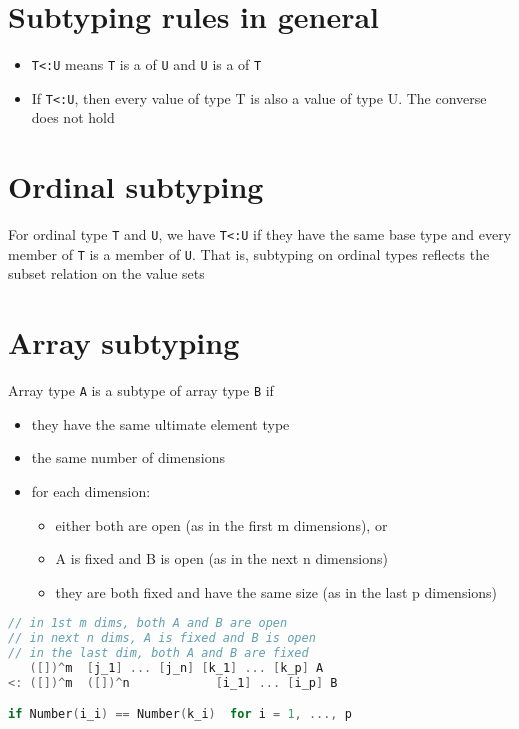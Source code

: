 \documentclass[10pt,a4paper,landscape]{article}
\begin{document}
\begin{multicols*}{3}
\section*{Subtyping rules in general}
\begin{itemize}
\item \texttt{T<:U} means \texttt{T} is a  of \texttt{U} and \texttt{U} is a  of \texttt{T}
\item If \texttt{T<:U}, then every value of type T is also a value of type U. The converse does not hold
\end{itemize}
\section*{Ordinal subtyping}
For ordinal type \texttt{T} and \texttt{U}, we have \texttt{T<:U} if they have the same base type and every member of \texttt{T} is a member of \texttt{U}. That is, subtyping on ordinal types reflects the subset relation on the value sets
\section*{Array subtyping}
Array type \texttt{A} is a subtype of array type \texttt{B} if
\begin{itemize}
\item they have the same ultimate element type
\item the same number of dimensions
\item for each dimension:
  \begin{itemize}[label=$\ast$]
  \item either both are open (as in the first m dimensions), or
  \item A is fixed and B is open (as in the next n dimensions)
  \item they are both fixed and have the same size (as in the last p dimensions)
  \end{itemize}
\end{itemize}
\begin{lstlisting}[language=c]
// in 1st m dims, both A and B are open
// in next n dims, A is fixed and B is open
// in the last dim, both A and B are fixed
   ([])^m  [j_1] ... [j_n] [k_1] ... [k_p] A
<: ([])^m  ([])^n            [i_1] ... [i_p] B

if Number(i_i) == Number(k_i)  for i = 1, ..., p
\end{lstlisting}

\end{multicols*}
\end{document}

